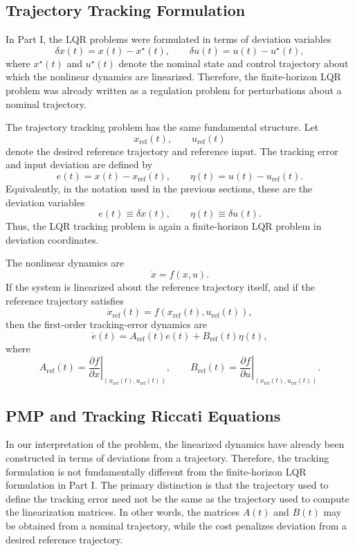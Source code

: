 
\subsection{Trajectory Tracking Formulation}

In Part I, the LQR problems were formulated in terms of deviation variables
\[
    \delta x(t) = x(t)-x^\star(t),
    \qquad
    \delta u(t) = u(t)-u^\star(t),
\]
where \(x^\star(t)\) and \(u^\star(t)\) denote the nominal state and control trajectory about which the nonlinear dynamics are linearized. Therefore, the finite-horizon LQR problem was already written as a regulation problem for perturbations about a nominal trajectory.

The trajectory tracking problem has the same fundamental structure. Let
\[
    x_{\mathrm{ref}}(t),
    \qquad
    u_{\mathrm{ref}}(t)
\]
denote the desired reference trajectory and reference input. The tracking error and input deviation are defined by
\[
    e(t) = x(t)-x_{\mathrm{ref}}(t),
    \qquad
    \eta(t)=u(t)-u_{\mathrm{ref}}(t).
\]
Equivalently, in the notation used in the previous sections, these are the deviation variables
\[
    e(t) \equiv \delta x(t),
    \qquad
    \eta(t) \equiv \delta u(t).
\]
Thus, the LQR tracking problem is again a finite-horizon LQR problem in deviation coordinates.

The nonlinear dynamics are
\[
    \dot x = f(x,u).
\]
If the system is linearized about the reference trajectory itself, and if the reference trajectory satisfies
\[
    \dot x_{\mathrm{ref}}(t)=f(x_{\mathrm{ref}}(t),u_{\mathrm{ref}}(t)),
\]
then the first-order tracking-error dynamics are
\[
    \dot e(t)
    =
    A_{\mathrm{ref}}(t)e(t)
    +
    B_{\mathrm{ref}}(t)\eta(t),
\]
where
\[
    A_{\mathrm{ref}}(t)
    =
    \left.
    \frac{\partial f}{\partial x}
    \right|_{(x_{\mathrm{ref}}(t),u_{\mathrm{ref}}(t))},
    \qquad
    B_{\mathrm{ref}}(t)
    =
    \left.
    \frac{\partial f}{\partial u}
    \right|_{(x_{\mathrm{ref}}(t),u_{\mathrm{ref}}(t))}.
\]


\subsection{PMP and Tracking Riccati Equations}
In our interpretation of the problem, the linearized dynamics have already been constructed in terms of deviations from a trajectory. Therefore, the tracking formulation is not fundamentally different from the finite-horizon LQR formulation in Part I. The primary distinction is that the trajectory used to define the tracking error need not be the same as the trajectory used to compute the linearization matrices. In other words, the matrices \(A(t)\) and \(B(t)\) may be obtained from a nominal trajectory, while the cost penalizes deviation from a desired reference trajectory.



